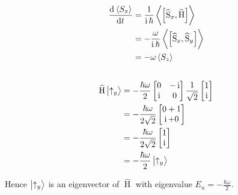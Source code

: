 \subsection{}
\begin{align*}
    \dod{\expectationvalue{S_x}}{t} & = \frac{1}{\operatorname{i} \hbar} \expectationvalue{\sbr{\widehat{\operatorname{S}}_x, \widehat{\operatorname{H}}}}\\
    & = - \frac{\omega}{\operatorname{i} \hbar} \expectationvalue{\sbr{\widehat{\operatorname{S}}_x, \widehat{\operatorname{S}}_y}}\\
    & = - \omega \expectationvalue{S_z}
\end{align*}

\subsection{}
\begin{align*}
    \widehat{\operatorname{H}} \ket{\uparrow_y} & = - \frac{\hbar \omega}{2}
    \begin{bmatrix}
        0 & -\operatorname{i}\\
        \operatorname{i} & 0
    \end{bmatrix}
    \frac{1}{\sqrt{2}}
    \begin{bmatrix}
        1\\
        \operatorname{i}
    \end{bmatrix}
    \\
    & = - \frac{\hbar \omega}{2 \sqrt{2}}
    \begin{bmatrix}
        0 + 1\\
        \operatorname{i} + 0
    \end{bmatrix}
    \\
    & = - \frac{\hbar \omega}{2 \sqrt{2}}
    \begin{bmatrix}
        1\\\operatorname{i}
    \end{bmatrix}
    \\
    & = - \frac{\hbar \omega}{2} \ket{\uparrow_y}
\end{align*}

Hence $ \ket{\uparrow_y} $ is an eigenvector of $ \widehat{\operatorname{H}} $ with eigenvalue $ E_u = - \frac{\hbar \omega}{2} $.

